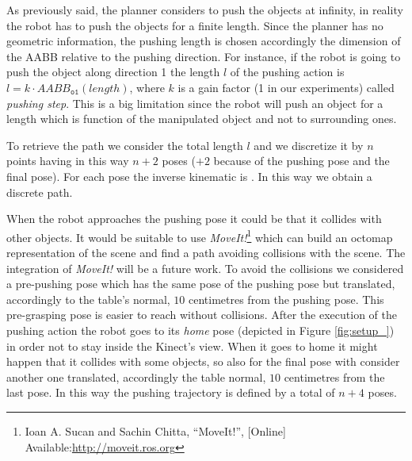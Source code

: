 As previously said, the planner considers to push the objects at infinity,  in reality the robot has to push the objects for a finite length. Since the planner has no geometric information, the pushing length is chosen accordingly the dimension of the AABB relative to the pushing direction.  For instance, if the robot is going to push the object  along direction 1\DM{,} the length $l$ of the pushing action is $l=k \cdot AABB_{\mathtt{o1}}(length)$, where $k$ is a gain factor (1 in our experiments) called \textit{pushing step}. This is a big limitation since the robot will push an object for a length which is function of the manipulated object and not to surrounding ones. 

To retrieve the path we consider the total length $l$ and we discretize it by $n$ points having in this way $n+2$ poses ($+2$ because of the pushing pose and the final pose). For each pose the inverse kinematic is . In this way we obtain a discrete path. 

When the robot approaches the pushing pose it could be that it collides with other objects. It would be suitable to use \textit{MoveIt!}\footnote{Ioan A. Sucan and Sachin Chitta, “MoveIt!”, [Online] Available:\href{http://moveit.ros.org} {\url{http://moveit.ros.org}}} which can build an octomap representation of the scene and find a path avoiding collisions with the scene. The integration of \textit{MoveIt!} will be a future work. To avoid the collisions we considered a pre-pushing pose which has the same pose of the pushing pose but translated, accordingly to the table's normal, $10$ centimetres from the pushing pose. This pre-grasping pose is easier to reach without collisions. 
After the execution of the pushing action the robot goes to its \textit{home} pose (depicted in Figure \ref{fig:setup_}) in order not to stay inside the Kinect's view. When it goes to home it might happen that it collides with some objects, so also for the final pose with consider another one translated, accordingly the table normal, $10$ centimetres from the last pose. 
In this way the pushing trajectory is defined by a total of $n+4$ poses. 



